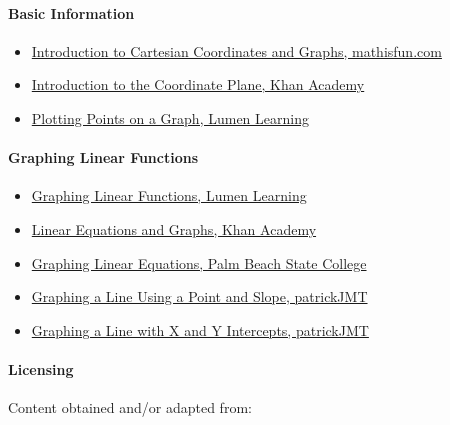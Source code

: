 \paragraph{Basic Information}

\begin{itemize}
    \item \href{https://www.mathsisfun.com/data/cartesian-coordinates.html}{Introduction to Cartesian Coordinates and Graphs, mathisfun.com}
    \item \href{https://www.khanacademy.org/math/algebra/x2f8bb11595b61c86:foundation-algebra/x2f8bb11595b61c86:algebra-overview-history/v/descartes-and-cartesian-coordinates}{Introduction to the Coordinate Plane, Khan Academy}
    \item \href{https://courses.lumenlearning.com/ivytech-collegealgebra/chapter/plotting-ordered-pairs-in-the-cartesian-coordinate-system/}{Plotting Points on a Graph, Lumen Learning}
\end{itemize}

\paragraph{Graphing Linear Functions}

\begin{itemize}
    \item \href{https://courses.lumenlearning.com/waymakercollegealgebra/chapter/graph-linear-functions/}{Graphing Linear Functions, Lumen Learning}
    \item \href{https://www.khanacademy.org/math/algebra/x2f8bb11595b61c86:linear-equations-graphs}{Linear Equations and Graphs, Khan Academy}
    \item \href{https://www.palmbeachstate.edu/prepmathlw/Documents/graphing\%20linear\%20equations.pdf}{Graphing Linear Equations, Palm Beach State College}
    \item \href{https://www.youtube.com/watch?v=lkRyxnqOb8M}{Graphing a Line Using a Point and Slope, patrickJMT}
    \item \href{https://www.youtube.com/watch?v=mxBoni8N70Y}{Graphing a Line with X and Y Intercepts, patrickJMT}
\end{itemize}

\paragraph{Licensing}

Content obtained and/or adapted from:

